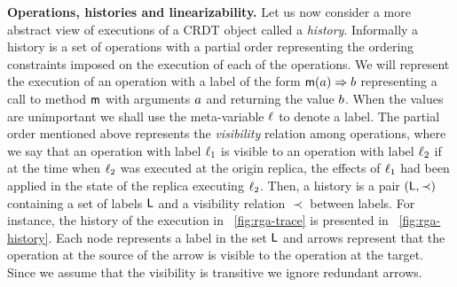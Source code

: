 \smallskip
\noindent
{\bf Operations, histories and linearizability.}
Let us now consider a more abstract view of executions of a 
CRDT object called a \emph{history}.
%
Informally a history is a set of operations with a partial order
representing the ordering constraints imposed on the execution of each
of the operations.
%
We will represent the execution of an operation with a label of the
form $\mathsf{m}(a) \Rightarrow b$ representing a call to method
$\mathsf{m}$ with arguments $a$ and returning the value $b$.
%
When the values are unimportant we shall use the meta-variable
$\ell$ to denote a label.%
%
The partial order mentioned above represents the \emph{visibility} relation among operations, where we say that an
operation with label $\ell_1$ is visible to an operation with
label $\ell_2$ if at the time when $\ell_2$ was executed
at the origin replica, the effects of $\ell_1$ had been applied
in the state of the replica executing $\ell_2$.
%
Then, a history is a pair $(\mathsf{L}, \prec)$ containing a
set of labels $\mathsf{L}$ and a visibility relation $\prec$ between labels. 
%
For instance, the history %
of the execution in \figureautorefname~\ref{fig:rga-trace} 
is presented in \figureautorefname~\ref{fig:rga-history}.
%
Each node represents a label in the set $\mathsf{L}$
and arrows represent that the operation at the source of the arrow
is visible to the operation at the target.
%
Since we assume that the visibility is transitive we ignore
redundant arrows.

